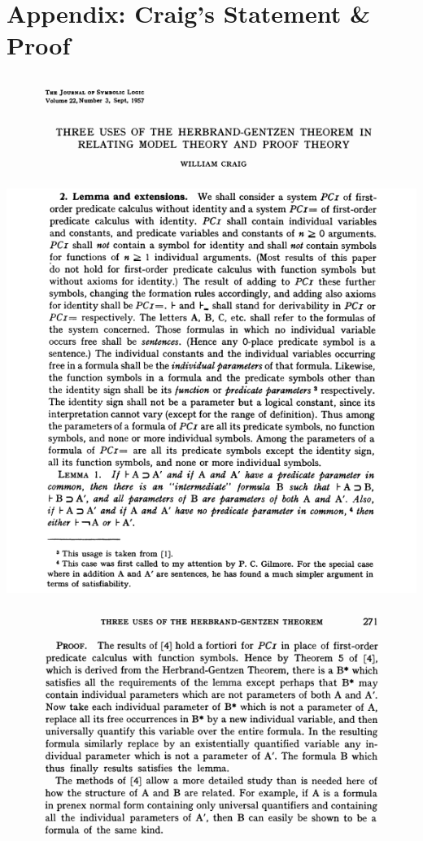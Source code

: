 \newpage
\section*{Appendix: Craig's Statement \& Proof}

\hspace{-2cm}\includegraphics[scale=0.7]{src/c0.png}

\hspace{-2.4cm}\includegraphics[scale=0.7]{src/c2.png}

\hspace{-2cm}\includegraphics[scale=0.7]{src/c3.png}

